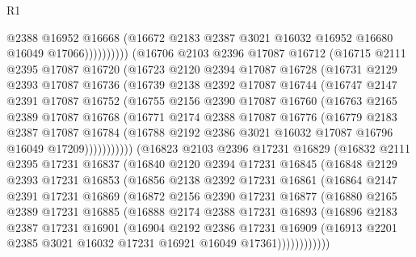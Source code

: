 \begin{lexlean}{R1}
\begin{coremodule}
                      @2388
                      @16952
                      @16668
                      (@16672 @2183 @2387 @3021 @16032 @16952 @16680 @16049 @17066))))))))))
    (@16706
      @2103
      @2396
      @17087
      @16712
      (@16715
        @2111
        @2395
        @17087
        @16720
        (@16723
          @2120
          @2394
          @17087
          @16728
          (@16731
            @2129
            @2393
            @17087
            @16736
            (@16739
              @2138
              @2392
              @17087
              @16744
              (@16747
                @2147
                @2391
                @17087
                @16752
                (@16755
                  @2156
                  @2390
                  @17087
                  @16760
                  (@16763
                    @2165
                    @2389
                    @17087
                    @16768
                    (@16771
                      @2174
                      @2388
                      @17087
                      @16776
                      (@16779
                        @2183
                        @2387
                        @17087
                        @16784
                        (@16788 @2192 @2386 @3021 @16032 @17087 @16796 @16049 @17209)))))))))))
    (@16823
      @2103
      @2396
      @17231
      @16829
      (@16832
        @2111
        @2395
        @17231
        @16837
        (@16840
          @2120
          @2394
          @17231
          @16845
          (@16848
            @2129
            @2393
            @17231
            @16853
            (@16856
              @2138
              @2392
              @17231
              @16861
              (@16864
                @2147
                @2391
                @17231
                @16869
                (@16872
                  @2156
                  @2390
                  @17231
                  @16877
                  (@16880
                    @2165
                    @2389
                    @17231
                    @16885
                    (@16888
                      @2174
                      @2388
                      @17231
                      @16893
                      (@16896
                        @2183
                        @2387
                        @17231
                        @16901
                        (@16904
                          @2192
                          @2386
                          @17231
                          @16909
                          (@16913 @2201 @2385 @3021 @16032 @17231 @16921 @16049 @17361))))))))))))

\end{coremodule}
\end{lexlean}
